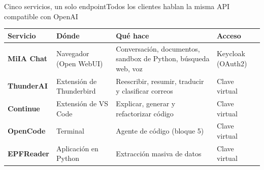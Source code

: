 

\begin{frame}{Cinco servicios, un solo endpoint}{Todos los clientes hablan la misma API compatible con OpenAI}
	\centering\footnotesize
	\setlength{\tabcolsep}{3pt}
	\begin{tabular}{@{}R{1.9cm}R{3.2cm}R{4.8cm}R{2.3cm}@{}}
		\toprule
		\textbf{Servicio}                       & \textbf{Dónde}           & \textbf{Qué hace}                                              & \textbf{Acceso}   \\
		\midrule
		\textbf{\textcolor{rojoUGR}{MiIA Chat}} & Navegador (Open WebUI)   & Conversación, documentos, sandbox de Python, búsqueda web, voz & Keycloak (OAuth2) \\[3pt]
		\textbf{ThunderAI}                      & Extensión de Thunderbird & Reescribir, resumir, traducir y clasificar correos             & Clave virtual     \\[3pt]
		\textbf{Continue}                       & Extensión de VS Code     & Explicar, generar y refactorizar código                        & Clave virtual     \\[3pt]
		\textbf{OpenCode}                       & Terminal                 & Agente de código (bloque 5)                                    & Clave virtual     \\[3pt]
		\textbf{EPFReader}                      & Aplicación en Python     & Extracción masiva de datos                                     & Clave virtual     \\
		\bottomrule
	\end{tabular}
\end{frame}

